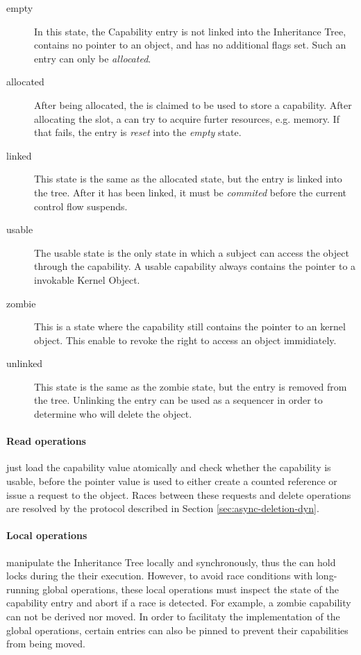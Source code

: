 \begin{description}
\item[empty] In this state, the Capability entry is not linked into the Inheritance Tree, contains no pointer to an object, and has no additional flags set. Such an entry can only be \emph{allocated}.
\item[allocated] After being allocated, the is claimed to be used to store a capability. After allocating the slot, a can try to acquire furter resources, e.g. memory. If that fails, the entry is \emph{reset} into the \emph{empty} state.
\item[linked] This state is the same as the allocated state, but the entry is linked into the tree. After it has been linked, it must be \emph{commited} before the current control flow suspends.
\item[usable] The usable state is the only state in which a subject can access the object through the capability. A usable capability always contains the pointer to a invokable Kernel Object.
\item[zombie] This is a state where the capability still contains the pointer to an kernel object. This enable to revoke the right to access an object immidiately.
\item[unlinked] This state is the same as the zombie state, but the entry is removed from the tree. Unlinking the entry can be used as a sequencer in order to determine who will delete the object.
\end{description}

\paragraph{Read operations} just load the capability value atomically and check whether the capability is usable, before the pointer value is used to either create a counted reference or issue a request to the object. Races between these requests and delete operations are resolved by the protocol described in Section \ref{sec:async-deletion-dyn}.

\paragraph{Local operations} manipulate the Inheritance Tree locally and synchronously, thus the can hold locks during the their execution. However, to avoid race conditions with long-running global operations, these local operations must inspect the state of the capability entry and abort if a race is detected. For example, a zombie capability can not be derived nor moved. In order to facilitaty the implementation of the global operations, certain entries can also be pinned to prevent their capabilities from being moved.

